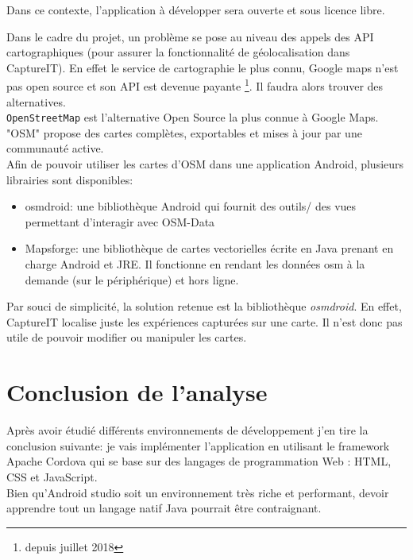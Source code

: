\documentclass{report}
\begin{document}
Dans ce contexte, l'application à développer sera ouverte et sous licence libre. 

Dans le cadre du projet, un problème se pose au niveau des appels des API cartographiques (pour assurer la fonctionnalité de géolocalisation dans CaptureIT). En effet le service de cartographie le plus connu, Google maps n'est pas open source et son API est devenue payante \footnote{depuis juillet 2018}. Il faudra alors trouver des alternatives.\\


\texttt{OpenStreetMap} est l'alternative Open Source la plus connue à Google Maps. "OSM" propose des cartes complètes, exportables et mises à jour par une communauté active.\\

Afin de pouvoir utiliser les cartes d'OSM dans une application Android, plusieurs librairies sont disponibles:

\begin{itemize}
    \item osmdroid: une bibliothèque Android qui fournit des outils/ des vues permettant d'interagir avec OSM-Data \cite{ref9}
    \item Mapsforge: une bibliothèque de cartes vectorielles écrite en Java prenant en charge Android et JRE. Il fonctionne en rendant les données osm à la demande (sur le périphérique) et hors ligne.
\end{itemize}

Par souci de simplicité, la solution retenue est la bibliothèque \emph{osmdroid}. En effet, CaptureIT localise juste les expériences capturées sur une carte. Il n'est donc pas utile de pouvoir modifier ou manipuler les cartes. 







\chapter{Conclusion de l'analyse}
Après avoir étudié différents environnements de développement j'en tire la conclusion suivante:
je vais implémenter l’application en utilisant le framework Apache Cordova qui se base sur des langages de programmation Web : HTML, CSS et JavaScript. \\
Bien qu'Android studio soit un environnement très riche et performant, devoir apprendre tout un langage natif Java pourrait être contraignant.\\
\end{document}
